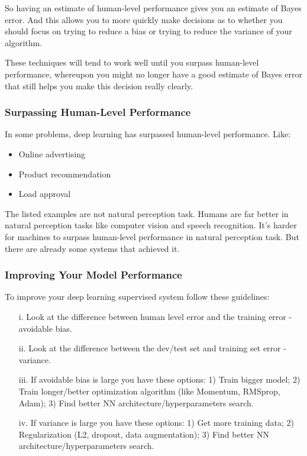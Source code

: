 So having an estimate of human-level performance gives you an estimate of Bayes error. And this allows you to more quickly make decisions as to whether you should focus on trying to reduce a bias or trying to reduce the variance of your algorithm.

These techniques will tend to work well until you surpass human-level performance, whereupon you might no longer have a good estimate of Bayes error that still helps you make this decision really clearly.

\subsubsection{Surpassing Human-Level Performance}
In some problems, deep learning has surpassed human-level performance. Like:

\begin{itemize}
    \item Online advertising
    \item Product recommendation
    \item Load approval
\end{itemize}

The listed examples are not natural perception task. Humans are far better in natural perception tasks like computer vision and speech recognition. It's harder for machines to surpass human-level performance in natural perception task. But there are already some systems that achieved it.

\subsubsection{Improving Your Model Performance}
To improve your deep learning supervised system follow these guidelines:

\begin{itemize}
    \item[i.] Look at the difference between human level error and the training error - avoidable bias.
    \item[ii.] Look at the difference between the dev/test set and training set error - variance.
    \item[iii.] If avoidable bias is large you have these options: 1) Train bigger model; 2) Train longer/better optimization algorithm (like Momentum, RMSprop, Adam); 3) Find better NN architecture/hyperparameters search.
    \item[iv.] If variance is large you have these options: 1) Get more training data; 2) Regularization (L2, dropout, data augmentation); 3) Find better NN architecture/hyperparameters search.
\end{itemize}


